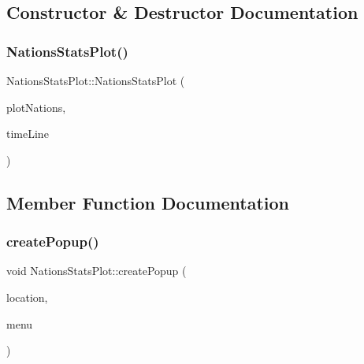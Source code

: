 \subsection{Constructor \& Destructor Documentation}
\mbox{\label{class_nations_stats_plot_a5dca577eebb1e30ca19c81c2d68a3c5b}} 
\subsubsection{\texorpdfstring{NationsStatsPlot()}{NationsStatsPlot()}}
{\footnotesize\ttfamily Nations\+Stats\+Plot\+::\+Nations\+Stats\+Plot (\begin{DoxyParamCaption}\item[{\mbox{\hyperlink{class_q_custom_plot}{Q\+Custom\+Plot}} $\ast$}]{plot\+Nations,  }\item[{\mbox{\hyperlink{class_q_c_p_item_line}{Q\+C\+P\+Item\+Line}} $\ast$}]{time\+Line }\end{DoxyParamCaption})}



\subsection{Member Function Documentation}
\mbox{\label{class_nations_stats_plot_afc653896a7282fe0fdcb36e064c9155d}} 
\subsubsection{\texorpdfstring{createPopup()}{createPopup()}}
{\footnotesize\ttfamily void Nations\+Stats\+Plot\+::create\+Popup (\begin{DoxyParamCaption}\item[{\mbox{\hyperlink{class_graph_interaction_controller_a67e6eba082927bf2b984bed54fe32764}{Graph\+Interaction\+Controller\+::\+Popup\+Menu\+Location}}}]{location,  }\item[{Q\+Menu $\ast$}]{menu }\end{DoxyParamCaption})}

\mbox{\label{class_nations_stats_plot_aee0dd7349472d05b13e5f4916380e117}} 
